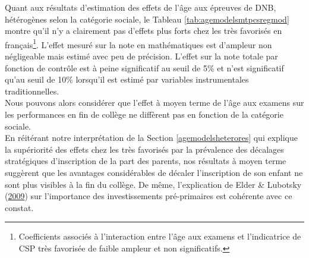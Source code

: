 \documentclass[
]{book}
\begin{document}
\quad Quant aux résultats d'estimation des effets de l'âge aux épreuves de DNB, hétérogènes selon la catégorie sociale, le Tableau \ref{tab:agemodelsmtpcsregmod} montre qu'il n'y a clairement pas d'effets plus forts chez les très favorisés en français\footnote{Coefficients associés à l'interaction entre l'âge aux examens et l'indicatrice de CSP très favorisée de faible ampleur et non significatifs.}. L'effet mesuré sur la note en mathématiques est d'ampleur non négligeable mais estimé avec peu de précision. L'effet sur la note totale par fonction de contrôle est à peine significatif au seuil de 5\% et n'est significatif qu'au seuil de 10\% lorsqu'il est estimé par variables instrumentales traditionnelles.\\
Nous pouvons alors considérer que l'effet à moyen terme de l'âge aux examens sur les performances en fin de collège ne diffèrent pas en fonction de la catégorie sociale.\\
En réitérant notre interprétation de la Section \ref{agemodelsheterores} qui explique la supériorité des effets chez les très favorisés par la prévalence des décalages stratégiques d'inscription de la part des parents, nos résultats à moyen terme suggèrent que les avantages considérables de décaler l'inscription de son enfant ne sont plus visibles à la fin du collège. De même, l'explication de Elder \& Lubotsky (\protect\hyperlink{ref-ELD:LUB:09}{2009}) sur l'importance des investissements pré-primaires est cohérente avec ce constat.

\begingroup\fontsize{8}{10}\selectfont
\end{document}
